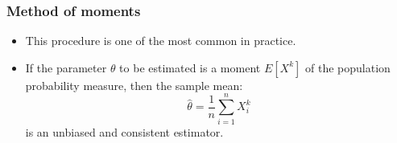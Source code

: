 \documentclass[main.tex]{subfiles}
\begin{document}
\begin{frame}
    \frametitle{Method of moments}
\begin{itemize}
    \item<+-> This procedure is one of the most common in practice.
    \item<+-> If the parameter $\theta$ to be estimated is a moment $E\left[ X^k \right]$ of the population probability measure, then
    the sample mean:
    \begin{equation}
        \hat{\theta} = \frac{1}{n} \sum_{i=1}^n X_i^k
    \end{equation}
    is an unbiased and consistent estimator.
\end{itemize}
    

\end{frame}
\end{document}
